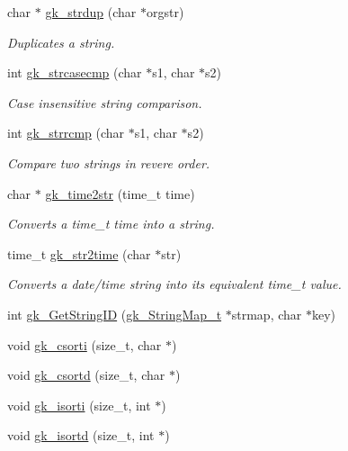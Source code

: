 \begin{DoxyCompactItemize}
char $\ast$ \hyperlink{a00077_af62038e97ca55f14ec2557a01bd85ca2}{gk\+\_\+strdup} (char $\ast$orgstr)
\begin{DoxyCompactList}\small\item\em Duplicates a string. \end{DoxyCompactList}\item 
int \hyperlink{a00077_a47570da67818e57e97fdd464bc60fbd1}{gk\+\_\+strcasecmp} (char $\ast$s1, char $\ast$s2)
\begin{DoxyCompactList}\small\item\em Case insensitive string comparison. \end{DoxyCompactList}\item 
int \hyperlink{a00077_a50149c8c9f8dd36fcad46773f35eedc4}{gk\+\_\+strrcmp} (char $\ast$s1, char $\ast$s2)
\begin{DoxyCompactList}\small\item\em Compare two strings in revere order. \end{DoxyCompactList}\item 
char $\ast$ \hyperlink{a00077_a79ca4ee9f715e6ce364af43f7f7a6cfc}{gk\+\_\+time2str} (time\+\_\+t time)
\begin{DoxyCompactList}\small\item\em Converts a time\+\_\+t time into a string. \end{DoxyCompactList}\item 
time\+\_\+t \hyperlink{a00077_a5973a9945423f69a60d3b209082fd718}{gk\+\_\+str2time} (char $\ast$str)
\begin{DoxyCompactList}\small\item\em Converts a date/time string into its equivalent time\+\_\+t value. \end{DoxyCompactList}\item 
int \hyperlink{a00077_acd02cb328067e37baaeff8c7d887dc10}{gk\+\_\+\+Get\+String\+ID} (\hyperlink{a00646}{gk\+\_\+\+String\+Map\+\_\+t} $\ast$strmap, char $\ast$key)
\item 
void \hyperlink{a00077_ae4a729a99be8753a82acb031b3d78434}{gk\+\_\+csorti} (size\+\_\+t, char $\ast$)
\item 
void \hyperlink{a00077_a79f6ece86c0673dfb80fe52796de8fab}{gk\+\_\+csortd} (size\+\_\+t, char $\ast$)
\item 
void \hyperlink{a00077_a0661d91bb9fcaa78715176ae9d5f8825}{gk\+\_\+isorti} (size\+\_\+t, int $\ast$)
\item 
void \hyperlink{a00077_a36a2b736c24758a30ff91e715c68b3a5}{gk\+\_\+isortd} (size\+\_\+t, int $\ast$)

\end{DoxyCompactItemize}
